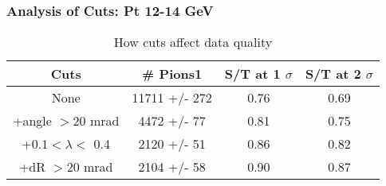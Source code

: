 \frame
{
\frametitle{Analysis of Cuts: Pt 12-14 GeV}
\begin{table}
\caption{How cuts affect data quality}
\centering
\begin{tabular}{c c c c}
\hline\hline
Cuts & \# Pions1 & S/T at 1 $\sigma$ & S/T at 2 $\sigma$ \\ [0.5ex]
\hline
None & 11711 +/-  272 & 0.76 & 0.69 \\ %
+angle $> 20$ mrad & 4472 +/-   77 & 0.81 & 0.75 \\ %
+$0.1 < \lambda <$ 0.4 & 2120 +/-   51 & 0.86 & 0.82 \\ %
+dR $> 20$ mrad & 2104 +/-   58 & 0.90 & 0.87 \\ %
[1ex]
\hline
\end{tabular}
\label{table:nonlin}
\end{table}
}
